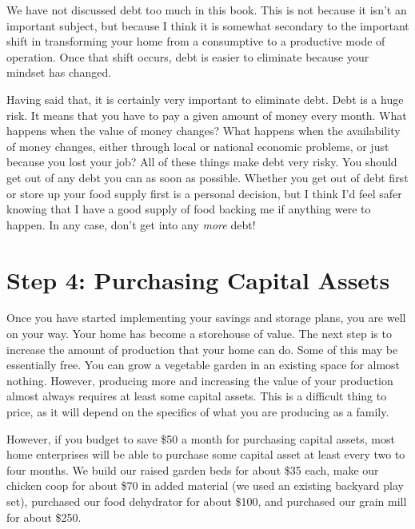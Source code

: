 \begin{infonote}

We have not discussed debt too much in this book. This is not because it
isn't an important subject, but because I think it is
somewhat secondary to the important shift in transforming your home
from a consumptive to a productive mode of operation. Once that shift
occurs, debt is easier to eliminate because your mindset has changed. 

Having said that, it is certainly very important to eliminate debt. Debt
is a huge risk. It means that you have to pay a given amount of money
every month. What happens when the value of money changes?  What
happens when the availability of money changes, either through local or
national economic problems, or just because you lost your job?  All of
these things make debt very risky. You should get out of any debt you
can as soon as possible. Whether you get out of debt first or store up
your food supply first is a personal decision, but I think
I'd feel safer knowing that I have a good supply of
food backing me if anything were to happen. In any case,
don't get into any \textit{more} debt!

\end{infonote}

\section{Step 4: Purchasing Capital Assets}

Once you have started implementing your savings and storage plans, you
are well on your way. Your home has become a storehouse of value. The
next step is to increase the amount of production that your home can
do. Some of this may be essentially free. You can grow a vegetable
garden in an existing space for almost nothing. However, producing more
and increasing the value of your production almost always requires at
least some capital assets. This is a difficult thing to price, as it
will depend on the specifics of what you are producing as a family.

However, if you budget to save \$50 a month for purchasing capital
assets, most home enterprises will be able to purchase some capital
asset at least every two to four months. We build our raised garden
beds for about \$35 each, make our chicken coop for about \$70 in added
material (we used an existing backyard play set), purchased our food
dehydrator for about \$100, and purchased our grain mill for about
\$250. 

